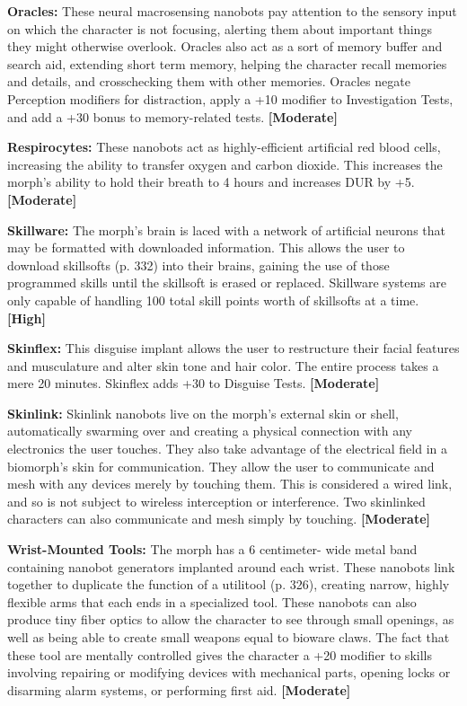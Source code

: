 \textbf{Oracles:} These neural macrosensing nanobots pay attention to the sensory input on which the character is not focusing, alerting them about important things they might otherwise overlook. Oracles also act as a sort of memory buffer and search aid, extending short term memory, helping the character recall memories and details, and crosschecking them with other memories. Oracles negate Perception modifiers for distraction, apply a +10 modifier to Investigation Tests, and add a +30 bonus to memory-related tests. \textbf{[Moderate]} 

\textbf{Respirocytes:} These nanobots act as highly-efficient artificial red blood cells, increasing the ability to transfer oxygen and carbon dioxide. This increases the morph’s ability to hold their breath to 4 hours and increases DUR by +5. \textbf{[Moderate]} 

\textbf{Skillware:} The morph’s brain is laced with a network of artificial neurons that may be formatted with downloaded information. This allows the user to download skillsofts (p. 332) into their brains, gaining the use of those programmed skills until the skillsoft is erased or replaced. Skillware systems are only capable of handling 100 total skill points worth of skillsofts at a time. \textbf{[High]} 

\textbf{Skinflex:} This disguise implant allows the user to restructure their facial features and musculature and alter skin tone and hair color. The entire process takes a mere 20 minutes. Skinflex adds +30 to Disguise Tests. \textbf{[Moderate]} 

\textbf{Skinlink:} Skinlink nanobots live on the morph’s external skin or shell, automatically swarming over and creating a physical connection with any electronics the user touches. They also take advantage of the electrical field in a biomorph’s skin for communication. They allow the user to communicate and mesh with any devices merely by touching them. This is considered a wired link, and so is not subject to wireless interception or interference. Two skinlinked characters can also communicate and mesh simply by touching. \textbf{[Moderate]} 

\textbf{Wrist-Mounted Tools:} The morph has a 6 centimeter- wide metal band containing nanobot generators implanted around each wrist. These nanobots link together to duplicate the function of a utilitool (p. 326), creating narrow, highly flexible arms that each ends in a specialized tool. These nanobots can also produce tiny fiber optics to allow the character to see through small openings, as well as being able to create small weapons equal to bioware claws. The fact that these tool are mentally controlled gives the character a +20 modifier to skills involving repairing or modifying devices with mechanical parts, opening locks or disarming alarm systems, or performing first aid. \textbf{[Moderate]} 



